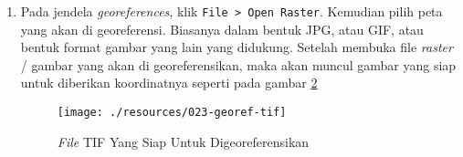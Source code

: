 \begin{enumerate}[1.]
  Setelah memilih menu \verb|georeferencer| maka akan muncul jendela seperti pada gambar \ref{fig:georefwin}.
  
  \begin{figure}[H]
    \centering
    \texttt{[image: ./resources/022-georef-win]}
    \caption{Jendela \textit{Georeferencer}}
    \label{fig:georefwin}
  \end{figure}
  
  \item Pada jendela \textit{georeferences}, klik \verb|File > Open Raster|. Kemudian pilih peta yang akan di georeferensi. Biasanya dalam bentuk JPG, atau GIF, atau bentuk format gambar yang lain yang didukung. Setelah membuka file \textit{raster} / gambar yang akan di georeferensikan, maka akan muncul gambar yang siap untuk diberikan koordinatnya seperti pada gambar \ref{fig:georeftif}
  
  \begin{figure}[H]
    \centering
    \texttt{[image: ./resources/023-georef-tif]}
    \caption{\textit{File} TIF Yang Siap Untuk Digeoreferensikan}
    \label{fig:georeftif}
  \end{figure}
  
\end{enumerate}
